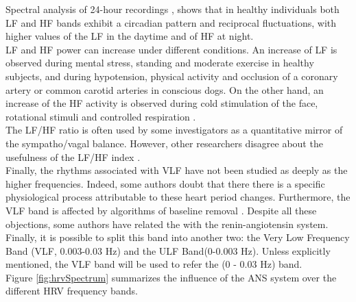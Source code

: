 \documentclass[12pt,lot, lof]{puthesis}
\begin{document}
Spectral analysis of 24-hour recordings  \cite{24hrecords}, \cite{malliani} 
shows that in healthy individuals 
both \gls{LF} and \gls{HF} bands exhibit a circadian pattern and reciprocal 
fluctuations, with higher values of the \gls{LF} in the
daytime and of \gls{HF} at night.\\

\gls{LF} and \gls{HF} power can increase under different conditions. An 
increase of \gls{LF} is observed during mental stress, standing and
moderate exercise in healthy subjects, and during hypotension, physical 
activity and occlusion of a coronary artery or common
carotid arteries in conscious dogs. On the other hand, an increase of the 
\gls{HF} activity is observed during cold stimulation of the
face, rotational stimuli and controlled respiration \cite{forceHRV}.\\

 
The LF/HF ratio is often used by some investigators \cite{forceHRV} as a 
quantitative mirror of the sympatho/vagal balance. However,
other researchers disagree about the usefulness of the LF/HF index 
\cite{berntson1997}.\\

Finally, the rhythms associated with \gls{VLF} have not been studied as deeply 
as the higher frequencies. Indeed, some authors doubt that there there is a 
specific physiological process attributable to these heart period changes. 
Furthermore, the VLF band is affected by algorithms  of baseline removal 
\cite{forceHRV}. Despite all these objections, some authors have related the 
 with the renin-angiotensin system. Finally, 
it is possible to split this band into another two: the Very Low Frequency Band 
(\gls{VLF}, 0.003-0.03 Hz) and the \gls{ULF} Band(0-0.003 Hz).
Unless explicitly mentioned, the \gls{VLF} band will be used to refer the  (0 - 
0.03 Hz) band.\\

Figure \ref{fig:hrvSpectrum} summarizes the influence of the \gls{ANS} system 
over the different \gls{HRV} frequency bands.\\
\end{document}
